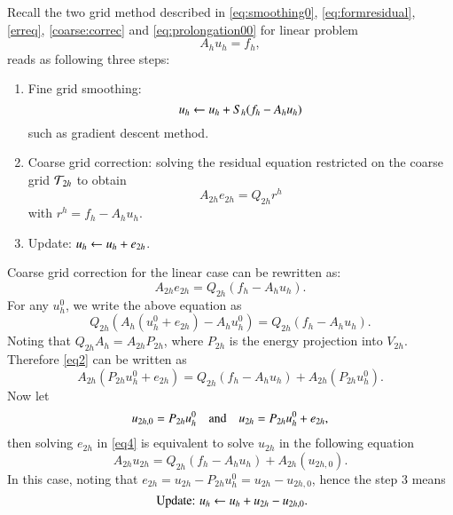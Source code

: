Recall the two grid method described in \eqref{eq:smoothing0}, \eqref{eq:formresidual}, \eqref{erreq}, \eqref{coarse:correc} and \eqref{eq:prolongation00}
for linear problem 
\begin{equation}\label{linearA}
A_hu_h=f_h,
\end{equation}
reads as following three steps:
\begin{enumerate}
\item Fine grid smoothing: 
$$
u_h\leftarrow u_h+S_h(f_h-A_hu_h)
$$
such as gradient descent method. 
\item Coarse grid correction: solving the residual equation restricted
on the coarse grid ${\cal T}_{2h}$ to obtain
$$
        A_{2h}e_{2h}=Q_{2h}r^h
$$
with $r^h=f_h-A_h u_h$. 
\item Update: $u_h\leftarrow u_h+e_{2h}$.
\end{enumerate}
Coarse grid correction for the linear case can be rewritten as: 
$$
 A_{2h}e_{2h}=Q_{2h}(f_h-A_h u_h).
 $$
 For any $u_h^0$, we write the above equation as  
 \begin{equation}\label{eq2}
Q_{2h}(A_{h}(u_h^0+e_{2h})-A_hu_h^0)=Q_{2h}(f_h-A_h u_h).
 \end{equation}
 Noting that $Q_{2h}A_{h}=A_{2h}P_{2h}$, where $P_{2h}$ is the energy projection 
 into $V_{2h}$. 
 Therefore \eqref{eq2} can be written as 
  \begin{equation}\label{eq4}
 A_{2h}(P_{2h} u_h^0+ e_{2h})=Q_{2h}(f_h-A_h u_h)+A_{2h} (P_{2h} u_h^0).
  \end{equation}
Now let 
$$
u_{2h,0}=P_{2h} u_h^0 \quad \hbox{and}\quad u_{2h}=P_{2h} u_h^0+ e_{2h},
$$
 then solving $e_{2h}$ in  \eqref{eq4} is equivalent to solve $u_{2h}$  in the following equation
\begin{equation}\label{eq5}
 A_{2h}u_{2h}=Q_{2h}(f_h-A_h u_h)+A_{2h} (u_{2h,0}).
 \end{equation}
 In this case, noting that $e_{2h}=u_{2h}-P_{2h} u_h^0=u_{2h}-u_{2h,0}$, hence the step 3 means 
 $$
\hbox{ Update:} \,\, u_h\leftarrow u_h+u_{2h}-u_{2h,0}.
 $$
 
